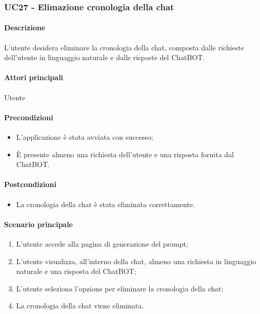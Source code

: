 \subsubsection{UC27 - Elimazione cronologia della chat}\label{UC27}

\paragraph*{Descrizione}
L'utente desidera eliminare la cronologia della chat, composta dalle richieste dell'utente in linguaggio naturale e dalle risposte del ChatBOT.

\paragraph*{Attori principali}
Utente

\paragraph*{Precondizioni}
\begin{itemize}
  \item L'applicazione è stata avviata con successo;
  \item È presente almeno una richiesta dell'utente e una risposta fornita dal ChatBOT.
\end{itemize}

\paragraph*{Postcondizioni}
\begin{itemize}
  \item La cronologia della chat è stata eliminata correttamente.
\end{itemize}

\paragraph*{Scenario principale}
\begin{enumerate}
  \item L'utente accede alla pagina di generazione del prompt;
  \item L'utente visualizza, all'interno della chat, almeno una richiesta in linguaggio naturale e una risposta del ChatBOT;
  \item L'utente seleziona l'opzione per eliminare la cronologia della chat;
  \item La cronologia della chat viene eliminata.
\end{enumerate}
